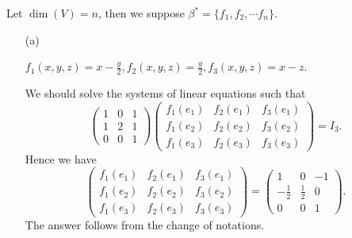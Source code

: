 \begin{Exercise}
	Let $\dim(V) = n$, then we suppose $\beta^* = \{f_1,f_2,\cdots f_n\}$.
	\begin{enumerate}[(a)]
		\item[(a)]
		\begin{answer}
			$f_1(x,y,z) = x-\frac{y}{2},f_2(x,y,z) = \frac{y}{2},f_3(x,y,z) = x-z$.
		\end{answer}
		\begin{solution}
			We should solve the systems of linear equations such that
			$$
			\begin{pmatrix}
			1 & 0 & 1 \\
			1 & 2 & 1 \\
			0 & 0 & 1
			\end{pmatrix} \begin{pmatrix}
			f_1(e_1) & f_2(e_1) & f_3(e_1) \\
			f_1(e_2) & f_2(e_2) & f_3(e_2) \\
			f_1(e_3) & f_2(e_3) & f_3(e_3)
			\end{pmatrix} = I_3.
			$$
			Hence we have
			$$
			\begin{pmatrix}
			f_1(e_1) & f_2(e_1) & f_3(e_1) \\
			f_1(e_2) & f_2(e_2) & f_3(e_2) \\
			f_1(e_3) & f_2(e_3) & f_3(e_3)
			\end{pmatrix} = \begin{pmatrix}
			1 & 0 & -1 \\
			-\frac{1}{2} & \frac{1}{2} & 0 \\
			0 & 0 & 1
			\end{pmatrix}.
			$$
			The answer follows from the change of notations.
		\end{solution}
		

\end{enumerate}
\end{Exercise}
